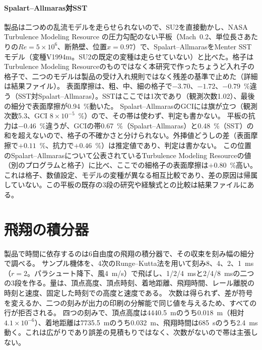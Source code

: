 \documentclass[twocolumn]{labreport}
\begin{document}
\paragraph{Spalart--Allmaras対SST}
\label{sec:model}
製品は二つめの乱流モデルを走らせられないので、SU2を直接動かし、NASA Turbulence Modeling Resource \citep{tmr}の圧力勾配のない平板（Mach~0.2、単位長さあたりの$Re=5\times10^{6}$、断熱壁、位置$x=0.97$）で、Spalart--AllmarasをMenter SSTモデル（変種V1994m。SU2の既定の変種は走らせていない）と比べた。格子はTurbulence Modeling Resourceのものではなく本研究で作ったちょうど入れ子の格子で、二つのモデルは製品の受け入れ規則ではなく残差の基準で止めた（詳細は結果ファイル）。
表面摩擦は、粗、中、細の格子で$-3.70$、$-1.72$、$-0.79$~\%違う（SST対Spalart--Allmaras）。SSTはここでは1次であり（観測次数1.02）、最後の細分で表面摩擦が0.94~\%動いた。
Spalart--AllmarasのGCIには旗が立つ（観測次数5.3、GCI $8\times10^{-5}$~\%）ので、その帯は使わず、判定も書かない。
平板の抗力は$-0.46$~\%違うが、GCIの帯0.67~\%（Spalart--Allmaras）と0.48~\%（SST）の和を超えないので、格子の不確かさと分けられない。外挿値どうしの差（表面摩擦で$+0.11$~\%、抗力で$+0.46$~\%）は推定値であり、判定は書かない。
この位置のSpalart--Allmarasについて公表されているTurbulence Modeling Resourceの値（別のプログラムと格子）に比べ、ここでの細格子の表面摩擦は$+0.80$~\%高い。これは格子、数値設定、モデルの変種が異なる相互比較であり、差の原因は帰属していない。この平板の既存の3段の研究や経験式との比較は結果ファイルにある。

\section{飛翔の積分器}
\label{sec:temporalapp}

製品で時間に依存するのは6自由度の飛翔の積分器で、その収束を刻み幅の細分で調べる。
サンプル機体を、4次のRunge--Kutta法を用いて刻み8、4、2、1~ms（$r=2$。パラシュート降下、風4~m/s）で飛ばし、1/2/4~msと2/4/8~msの二つの3段を作る。量は、頂点高度、頂点時刻、着地距離、飛翔時間、レール離脱の時刻と速度、固定した時刻での高度と速度である。
次数は得られず、差が符号を変えるか、二つの刻みが出力の印刷の分解能で同じ値を与えるため、すべての行が拒否される。
四つの刻みで、頂点高度は4440.5~mのうち$0.018$~m（相対$4.1\times10^{-6}$）、着地距離は7735.5~mのうち0.032~m、飛翔時間は685~sのうち2.4~ms動く。これは広がりであり誤差の見積もりではなく、次数がないので帯は主張しない。
\end{document}
